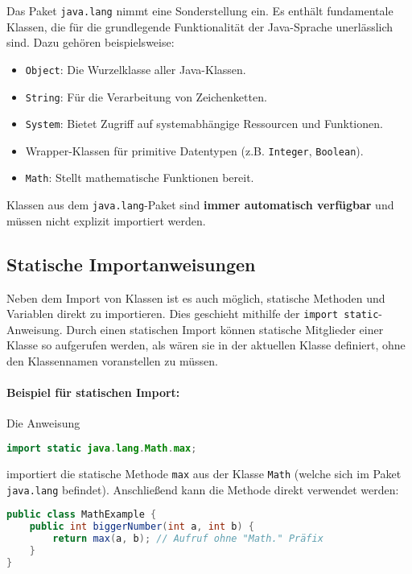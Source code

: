 Das Paket \texttt{java.lang} nimmt eine Sonderstellung ein. Es enthält fundamentale Klassen, die für die grundlegende 
Funktionalität der Java-Sprache unerlässlich sind. Dazu gehören beispielsweise:
\begin{itemize}
    \item \texttt{Object}: Die Wurzelklasse aller Java-Klassen.
    \item \texttt{String}: Für die Verarbeitung von Zeichenketten.
    \item \texttt{System}: Bietet Zugriff auf systemabhängige Ressourcen und Funktionen.
    \item Wrapper-Klassen für primitive Datentypen (z.B. \texttt{Integer}, \texttt{Boolean}).
    \item \texttt{Math}: Stellt mathematische Funktionen bereit.
\end{itemize}
Klassen aus dem \texttt{java.lang}-Paket sind \textbf{immer automatisch verfügbar} und müssen nicht explizit importiert werden.

\subsection{Statische Importanweisungen}
\label{ssec:statische_importe}

Neben dem Import von Klassen ist es auch möglich, statische Methoden und Variablen direkt zu importieren. 
Dies geschieht mithilfe der \texttt{import static}-Anweisung.
Durch einen statischen Import können statische Mitglieder einer Klasse so aufgerufen werden, als wären sie 
in der aktuellen Klasse definiert, ohne den Klassennamen voranstellen zu müssen.

\paragraph{Beispiel für statischen Import:}
Die Anweisung
\begin{lstlisting}[language=Java, caption={Statischer Import der max-Methode}]
import static java.lang.Math.max;
\end{lstlisting}
importiert die statische Methode \texttt{max} aus der Klasse \texttt{Math} (welche sich im Paket \texttt{java.lang} befindet).
Anschließend kann die Methode direkt verwendet werden:
\begin{lstlisting}[language=Java, caption={Verwendung nach statischem Import}]
public class MathExample {
    public int biggerNumber(int a, int b) {
        return max(a, b); // Aufruf ohne "Math." Präfix
    }
}
\end{lstlisting}


